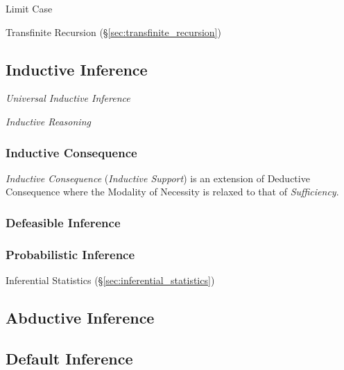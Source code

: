 Limit Case

Transfinite Recursion (\S\ref{sec:transfinite_recursion})



\subsection{Inductive Inference}\label{sec:inductive_inference}
\cite{hawthorne08}

\emph{Universal Inductive Inference}

\emph{Inductive Reasoning}



\subsubsection{Inductive Consequence}\label{sec:inductive_consequence}

\emph{Inductive Consequence} (\emph{Inductive Support}) is an
extension of Deductive Consequence where the Modality of Necessity is
relaxed to that of \emph{Sufficiency}.



\subsubsection{Defeasible Inference}\label{sec:defeasible_inference}

\subsubsection{Probabilistic Inference}\label{sec:probabilistic_inference}

Inferential Statistics (\S\ref{sec:inferential_statistics})



\subsection{Abductive Inference}\label{sec:abductive_inference}



\subsection{Default Inference}\label{sec:default_inference}

